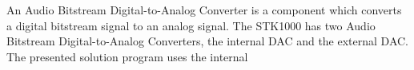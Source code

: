 An Audio Bitstream Digital-to-Analog Converter is a component which converts a digital bitstream signal to an analog signal.
The STK1000 has two Audio Bitstream Digital-to-Analog Converters, the internal DAC and the external DAC.
The presented solution program uses the internal


